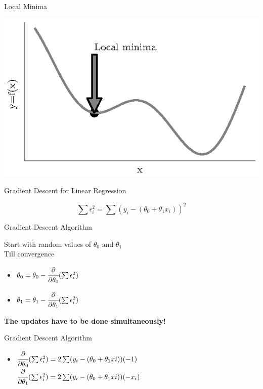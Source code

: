 \documentclass{beamer}
\begin{document}
	\begin{frame}{Local Minima}
\begin{center}
	\includegraphics[totalheight=6cm]{gradient-descent/local-minima.eps}
\end{center}
\end{frame}

	\begin{frame}{Gradient Descent for Linear Regression}

\begin{equation*}
\sum \epsilon_{i}^{2} = \sum (y_{i} - (\theta_{0} + \theta_{1}x_{i}))^{2}
\end{equation*}

\end{frame}

\begin{frame}{Gradient Descent Algorithm}

Start with random values of $\theta_{0}$ and $\theta_{1}$\\
Till convergence
\begin{itemize}
\item $\theta_{0} = \theta_{0} - \cfrac{\partial}{\partial \theta_{0}} (\sum \epsilon_{i}^{2}) $
\item $\theta_{1} = \theta_{1} - \cfrac{\partial}{\partial \theta_{1}} (\sum \epsilon_{i}^{2}) $
\end{itemize}

\textbf{The updates have to be done simultaneously!}
\end{frame}

\begin{frame}{Gradient Descent Algorithm}

\begin{itemize}
\item $\cfrac{\partial}{\partial \theta_{0}} (\sum \epsilon_{i}^{2}) = 2\sum (y_{i} - (\theta_{0} + \theta_{1}x{i}))(-1)$
$\cfrac{\partial}{\partial \theta_{1}} (\sum \epsilon_{i}^{2}) = 2\sum (y_{i} - (\theta_{0} + \theta_{1}x{i}))(-x_{i})$
\end{itemize}
\end{frame}
\end{document}
